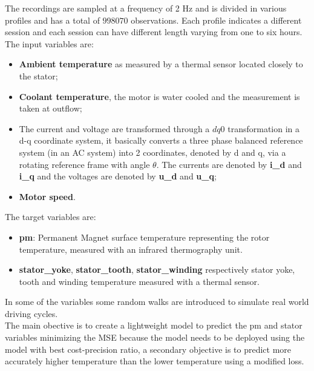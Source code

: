 The recordings are sampled at a frequency of 2 Hz and is divided in various profiles and has a total of $998070$ observations. 
Each profile indicates a different session and each session can have different length varying from one to six hours.\\
The input variables are:
\begin{itemize}[topsep=0ex, noitemsep]
    \item \textbf{Ambient temperature} as measured by a thermal sensor located closely to the stator;
    \item \textbf{Coolant temperature}, the motor is water cooled and the measurement is taken at outflow;
    \item The current and voltage are transformed through a $dq0$ transformation in a d-q coordinate system, it basically converts a three phase balanced reference system (in an AC system) into 2 coordinates, denoted by d and q, via a rotating reference frame with angle $\theta$.
    The currents are denoted by \textbf{i\_d} and \textbf{i\_q} and the voltages are denoted by \textbf{u\_d} and \textbf{u\_q};
    \item \textbf{Motor speed}.
\end{itemize}
The target variables are:
\begin{itemize}[topsep=0ex, noitemsep]
    \item \textbf{pm}: Permanent Magnet surface temperature representing the rotor temperature, measured with an infrared thermography unit.
    \item \textbf{stator\_yoke}, \textbf{stator\_tooth}, \textbf{stator\_winding} respectively stator yoke, tooth and winding temperature measured with a thermal sensor.
\end{itemize}
In some of the variables some random walks are introduced to simulate real world driving cycles.\\
The main obective is to create a lightweight model to predict the pm and stator variables minimizing the MSE because the model needs to be deployed using the model with best cost-precision ratio, a secondary objective is to predict more accurately higher temperature than the lower temperature using a modified loss.

